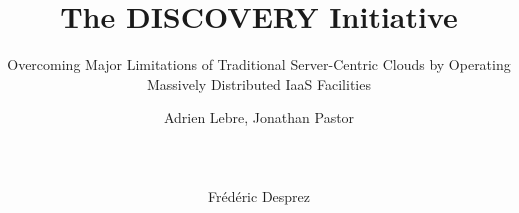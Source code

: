 \documentclass{acm/acm_proc_article-sp}
\begin{document}
\title{The DISCOVERY Initiative}
\subtitle{Overcoming Major Limitations of Traditional Server-Centric
 Clouds by Operating  Massively Distributed IaaS Facilities}%

\author{
%
Adrien Lebre, Jonathan Pastor\\
       \\
       \\
       \\
\alignauthor
Frédéric Desprez\\
       \\
       \\
       \\
}

\maketitle










%





\end{document}
